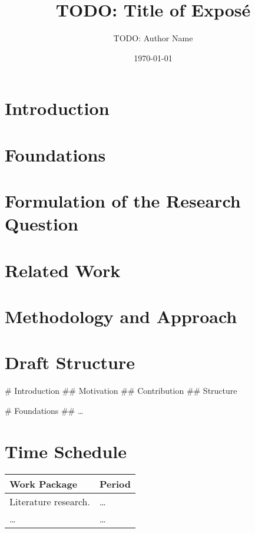 \documentclass{scrartcl}
\title{TODO: Title of Exposé}
\author{TODO: Author Name}
\date{\today}
\begin{document}
\maketitle


\section{Introduction}\label{sec:introduction}


\section{Foundations}\label{sec:foundations}


\section{Formulation of the Research Question}\label{sec:research-question}


\section{Related Work}\label{sec:related-work}


\section{Methodology and Approach}\label{sec:methodology}


\section{Draft Structure}\label{sec:draft}

\begin{easylist}[articletoc]
    # Introduction
    ## Motivation
    ## Contribution
    ## Structure

    # Foundations
    ## \dots
\end{easylist}


\section{Time Schedule}\label{sec:schedule}

\begin{longtable}{ll}
    \toprule

    \textbf{Work Package} & \textbf{Period} \\%
    \midrule%
    \endhead%

    Literature research.  & \dots           \\
    \dots                 & \dots           \\

    \bottomrule
\end{longtable}



\printbibliography
\end{document}
